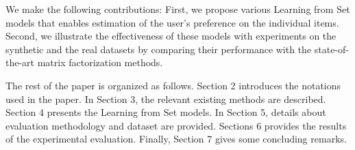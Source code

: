 
We make the following contributions: First, we propose various Learning from Set
models that enables estimation of the user's preference on the individual items.
Second, we illustrate the effectiveness of these models with experiments on the 
synthetic and the real datasets by comparing their performance with the state-of-the-art 
matrix factorization methods.


The rest of the paper is organized as follows. Section 2 introduces the
notations used in the paper. In Section 3, the relevant existing methods are
described. Section 4 presents the Learning from Set models. In Section 5,
details about evaluation methodology and dataset are provided. Sections 6
provides the results of the experimental evaluation. Finally, Section 7 gives
some concluding remarks.




